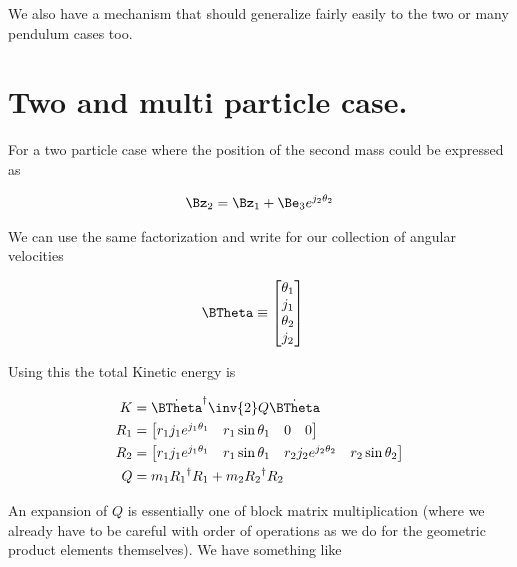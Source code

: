 We also have a mechanism that should generalize fairly easily to the two or many pendulum cases too.

\section{Two and multi particle case.}

For a two particle case where the position of the second mass could be expressed as

\begin{align}\label{eqn:sPolarMultiPendulum:zoo11a}
\Bz_2 = \Bz_1 + \Be_3 e^{j_2 \theta_2}
\end{align}

We can use the same factorization and write for our collection of angular velocities

\begin{align}\label{eqn:sPolarMultiPendulum:zoo11}
\BTheta &\equiv
\begin{bmatrix}
\theta_1 \\ j_1 \\
\theta_2 \\ j_2 \\
\end{bmatrix} 
\end{align}

Using this the total Kinetic energy is

\begin{align}\label{eqn:sPolarMultiPendulum:zoo12}
K &= {\dot{\BTheta}}^\dagger \inv{2} Q \dot{\BTheta} \\
R_1 &=
\begin{bmatrix}
r_1 j_1 e^{j_1\theta_1} & 
r_1 \sin\theta_1 &
0 &
0
\end{bmatrix} \\
R_2 &=
\begin{bmatrix}
 r_1 j_1 e^{j_1\theta_1} & 
 r_1 \sin\theta_1 &
 r_2 j_2 e^{j_2\theta_2} & 
 r_2 \sin\theta_2 
\end{bmatrix} \\
Q &=
m_1 {R_1}^\dagger R_1
+m_2 {R_2}^\dagger R_2
\end{align}

An expansion of $Q$ is essentially one of block matrix multiplication (where we already have to be careful with order of operations as we do for the geometric product elements themselves).  We have something like

